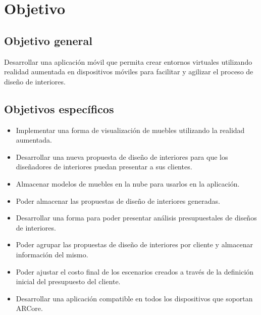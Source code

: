 \section{Objetivo}
\subsection{Objetivo general}
Desarrollar una aplicación móvil que permita crear entornos virtuales utilizando realidad aumentada en dispositivos móviles para facilitar y agilizar el proceso de diseño de interiores.

\subsection{Objetivos específicos}
\begin{itemize}
	\item Implementar una forma de visualización de muebles utilizando la realidad aumentada.
	\item Desarrollar una nueva propuesta de diseño de interiores para que los diseñadores de interiores puedan presentar a sus clientes.
	\item Almacenar modelos de muebles en la nube para usarlos en la aplicación.
	\item Poder almacenar las propuestas de diseño de interiores generadas.
	\item Desarrollar una forma para poder presentar análisis presupuestales de diseños de interiores.
	\item Poder agrupar las propuestas de diseño de interiores por cliente y almacenar información del mismo.
	\item Poder ajustar el costo final de los escenarios creados a través de la definición inicial del presupuesto del cliente.
	\item Desarrollar una aplicación compatible en todos los dispositivos que soportan ARCore.
\end{itemize}